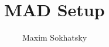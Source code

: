 
\renewcommand{\images}{http://synrc.com/apps/mad/doc/images}

\title{MAD Setup}
\author{Maxim Sokhatsky}



